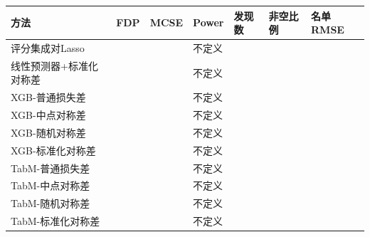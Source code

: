 \documentclass[UTF8,11pt,a4paper]{ctexart}
\begin{document}
{\def\LTcaptype{none} %
{
\footnotesize
\begin{longtable}[]{@{}
  >{\raggedright\arraybackslash}p{}
  >{\raggedright\arraybackslash}p{}
  >{\raggedright\arraybackslash}p{}
  >{\raggedright\arraybackslash}p{}
  >{\raggedright\arraybackslash}p{}
  >{\raggedright\arraybackslash}p{}
  >{\raggedright\arraybackslash}p{}@{}}
\toprule\noalign{}
\begin{minipage}[b]{\linewidth}\raggedright
方法
\end{minipage} & \begin{minipage}[b]{\linewidth}\raggedright
FDP
\end{minipage} & \begin{minipage}[b]{\linewidth}\raggedright
MCSE
\end{minipage} & \begin{minipage}[b]{\linewidth}\raggedright
Power
\end{minipage} & \begin{minipage}[b]{\linewidth}\raggedright
发现数
\end{minipage} & \begin{minipage}[b]{\linewidth}\raggedright
非空比例
\end{minipage} & \begin{minipage}[b]{\linewidth}\raggedright
名单RMSE
\end{minipage} \\
\midrule\noalign{}
\endhead
\bottomrule\noalign{}
\endlastfoot
评分集成对Lasso & 0.0300 & 0.0171 & 不定义 & 0.18 & 0.03 & 0.9992 \\
线性预测器+标准化对称差 & 0.0100 & 0.0100 & 不定义 & 0.05 & 0.01 & 0.9989 \\
XGB-普通损失差 & 0.0600 & 0.0239 & 不定义 & 0.54 & 0.06 & 0.9996 \\
XGB-中点对称差 & 0.0600 & 0.0239 & 不定义 & 0.34 & 0.06 & 0.9998 \\
XGB-随机对称差 & 0.0400 & 0.0197 & 不定义 & 0.24 & 0.04 & 0.9992 \\
XGB-标准化对称差 & 0.0600 & 0.0239 & 不定义 & 0.43 & 0.06 & 0.9996 \\
TabM-普通损失差 & 0.0600 & 0.0239 & 不定义 & 0.36 & 0.06 & 0.9997 \\
TabM-中点对称差 & 0.0500 & 0.0219 & 不定义 & 0.32 & 0.05 & 0.9997 \\
TabM-随机对称差 & 0.0300 & 0.0171 & 不定义 & 0.24 & 0.03 & 0.9990 \\
TabM-标准化对称差 & 0.0500 & 0.0219 & 不定义 & 0.35 & 0.05 & 0.9998 \\
\end{longtable}
}
}
\end{document}
